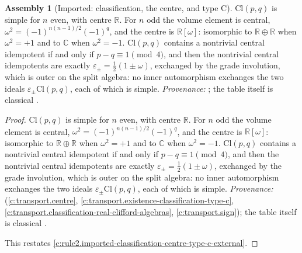 \documentclass[11pt]{article}
\theoremstyle{definition}
\newtheorem{assembled}[theorem]{Assembly}
\theoremstyle{plain}
\providecommand{\C}{}\renewcommand{\C}{\mathbb{C}}
\providecommand{\Cl}{}\renewcommand{\Cl}{\mathrm{Cl}}
\providecommand{\R}{}\renewcommand{\R}{\mathbb{R}}
\begin{document}
\begin{assembled}[Imported: classification, the centre, and type C]\label{c:rule2.imported-classification-centre-type-c}
$\Cl(p,q)$ is simple for $n$ even, with centre $\R$. For $n$ odd the volume element is central, $\omega^2 = (-1)^{n(n-1)/2}(-1)^q$, and the centre is $\R[\omega]$: isomorphic to $\R \oplus \R$ when $\omega^2 = +1$ and to $\C$ when $\omega^2 = -1$. $\Cl(p,q)$ contains a nontrivial central idempotent if and only if $p - q \equiv 1 \pmod 4$, and then the nontrivial central idempotents are exactly $\varepsilon_\pm = \tfrac12(1 \pm \omega)$, exchanged by the grade involution, which is outer on the split algebra: no inner automorphism exchanges the two ideals $\varepsilon_\pm \Cl(p,q)$, each of which is simple. \emph{Provenance:} \cite[Thm.~2.5, Lemmas 2.6 and 2.7, Thm.~3.6]{ButlerT1}; the table itself is classical \cite{ABS1964, Lounesto2001}.
\end{assembled}
\begin{proof}
$\Cl(p,q)$ is simple for $n$ even, with centre $\R$. For $n$ odd the volume element is central, $\omega^2 = (-1)^{n(n-1)/2}(-1)^q$, and the centre is $\R[\omega]$: isomorphic to $\R \oplus \R$ when $\omega^2 = +1$ and to $\C$ when $\omega^2 = -1$. $\Cl(p,q)$ contains a nontrivial central idempotent if and only if $p - q \equiv 1 \pmod 4$, and then the nontrivial central idempotents are exactly $\varepsilon_\pm = \tfrac12(1 \pm \omega)$, exchanged by the grade involution, which is outer on the split algebra: no inner automorphism exchanges the two ideals $\varepsilon_\pm \Cl(p,q)$, each of which is simple. \emph{Provenance:} \cite[Thm.~2.5, Lemmas 2.6 and 2.7, Thm.~3.6]{ButlerT1} (\ref{c:transport.centre}, \ref{c:transport.existence-classification-type-c}, \ref{c:transport.classification-real-clifford-algebras}, \ref{c:transport.sign}); the table itself is classical \cite{ABS1964, Lounesto2001}.

This restates \ref{c:rule2.imported-classification-centre-type-c-external}.

\end{proof}
\end{document}
